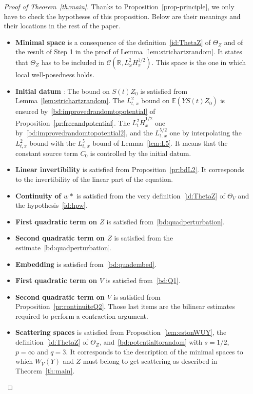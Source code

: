 \documentclass[AHL, Unicode, longabstracts,published]{cedram}
\newcommand{\R}{\mathbb{R}}
\newcommand{\E}{\mathbb{E}}
\newcommand{\mclC}{\mathcal{C}}
\begin{document}
\begin{proof}[Proof of Theorem~\ref{th:main}]
Thanks to Proposition~\ref{prop-principle}, we only have to check the hypotheses of this proposition. Below are their meanings and their locations in the rest of the paper.
\begin{itemize}
\item \textbf{Minimal space} is a consequence of the definition~\eqref{id:ThetaZ} of $\Theta_Z$ and of the result of Step 1 in the proof of Lemma~\ref{lem:strichartzrandom}. It states that $\Theta_Z$ has to be included in $\mclC(\R, L^2_\omega H^{1/2}_x)$. This space is the one in which local well-posedness holds.
\item \textbf{Initial datum} : The bound on $S(t)Z_0$ is satisfied from Lemma~\ref{lem:strichartzrandom}. The $L^2_{t,\,x}$ bound on $\E(\bar Y S(t) Z_0)$ is ensured by~\eqref{bd:improvedrandomtopotential} of Proposition~\ref{pr:freeandpotential}. The $L^2_t \dot H^{1/2}_x$ one by~\eqref{bd:improvedrandomtopotential2}, and the $L^{5/2}_{t,\,x}$ one by interpolating the $L^2_{t,x}$ bound with the $L^5_{t,\,x}$ bound of Lemma~\ref{lem:L5}. It means that the constant source term $C_0$ is controlled by the initial datum.
\item \textbf{Linear invertibility} is satisfied from Proposition~\ref{pr:bdL2}. It corresponds to the invertibility of the linear part of the equation.
\item \textbf{Continuity of $w*$} is satisfied from the very definition~\eqref{id:ThetaZ} of $\Theta_V$ and the hypothesis~\eqref{id:hpw}.
\item \textbf{First quadratic term on $Z$} is satisfied from~\eqref{bd:quadperturbation}.
\item \textbf{Second quadratic term on $Z$} is satisfied from the estimate~\eqref{bd:quadperturbation}.
\item \textbf{Embedding} is satisfied from~\eqref{bd:quadembed}.
\item \textbf{First quadratic term on $V$} is satisfied from~\eqref{bd:Q1}.
\item \textbf{Second quadratic term on $V$} is satisfied from Proposition~\ref{pr:continuiteQ2}. Those last items are the bilinear estimates required to perform a contraction argument.
\item \textbf{Scattering spaces} is satisfied from Proposition~\ref{lem:estonWUY}, the definition~\eqref{id:ThetaZ} of $\Theta_Z$, and~\eqref{bd:potentialtorandom} with $s=1/2$, $p=\infty$ and $q=3$. It corresponds to the description of the minimal spaces to which $W_V(Y)$ and $Z$ must belong to get scattering as described in Theorem~\ref{th:main}.\qedhere
\end{itemize}
\end{proof}
\end{document}
